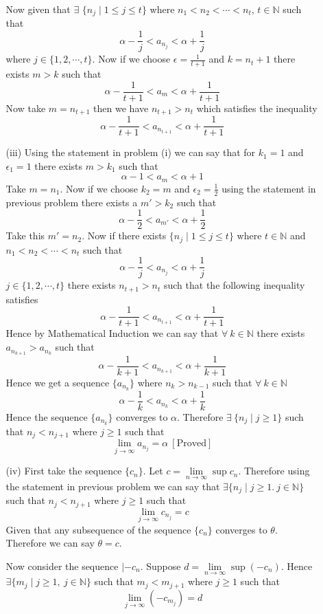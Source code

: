 \documentclass{article}
\begin{document}
\begin{enumerate}
\begin{enumerate}
	\hspace{1cm}Now given that $\exists$ $\{n_j\mid 1\leq j\leq t\}$ where $n_1<n_2<\cdots<n_t$, $t\in\mathbb{N}$ such that$$\alpha-\frac{1}{j}<a_{n_j}<\alpha+\frac1j$$where $j\in\{1,2,\cdots,t\}$. Now if we choose $\epsilon=\frac{1}{t+1}$ and $k=n_t+1$ there exists $m>k$ such that$$\alpha-\frac{1}{t+1}<a_{m}<\alpha+\frac1{t+1}$$Now take $m=n_{t+1}$ then we have $n_{t+1}>n_t$ which satisfies the inequality$$\alpha-\frac{1}{t+1}<a_{n_{t+1}}<\alpha+\frac1{t+1}$$
	\item[(iii)] Using the statement in problem (i) we can say that for $k_1=1$ and $\epsilon_1=1$ there exists $m>k_1$ such that $$\alpha-1<a_m<\alpha+1$$Take $m=n_1$. Now if we choose $k_2=m$ and $\epsilon_2=\frac12$ using the statement in previous problem there exists a $m'>k_2$ such that $$\alpha-\frac12<a_{m'}<\alpha+\frac12$$Take this $m'=n_2$. Now if there exists $\{n_j\mid 1\leq j\leq t\}$ where $t\in\mathbb{N}$ and $n_1<n_2<\cdots<n_t$ such that $$\alpha-\frac1j<a_{n_j}<\alpha+\frac1j$$$j\in\{1,2,\cdots,t\}$ there exists $n_{t+1}>n_t$ such that the following inequality satisfies$$\alpha-\frac1{t+1}<a_{n_{t+1}}<\alpha+\frac1{t+1}$$Hence by Mathematical Induction we can say that $\forall\ k\in\mathbb{N}$ there exists $a_{n_{k+1}}>a_{n_{k}}$ such that$$\alpha-\frac1{k+1}<a_{n_{k+1}}<\alpha+\frac1{k+1}$$Hence we get a sequence $\{a_{n_k}\}$ where $n_k>n_{k-1}$ such that $\forall \ k\in\mathbb{N}$ $$\alpha-\frac1k<a_{n_k}<\alpha+\frac1k$$Hence the sequence $\{a_{n_k}\}$ converges to $\alpha$. Therefore $\exists\ \{n_j\mid j\geq 1\} $ such that $n_j<n_{j+1}$ where $j\geq 1$ such that $$\lim\limits_{j\to\infty}a_{n_j}=\alpha\ [\text{Proved}]$$
	\item[(iv)] First take the sequence $\{c_n\}$. Let $c=\lim\limits_{n\to\infty}\sup c_n$. Therefore using the statement in previous problem we can say that $\exists \{n_j\mid j\geq 1.\ j\in\mathbb{N}\} $ such that $n_j<n_{j+1}$ where $j\geq 1$ such that $$\lim\limits_{j\to\infty}c_{n_j}=c$$Given that any subsequence of the sequence $\{c_n\}$ converges to $\theta$. Therefore we can say $\theta=c$.
	
	\hspace{1cm}Now consider the sequence $|{-c_n}$. Suppose $d=\lim\limits_{n\to\infty}\sup (-c_n)$. Hence $\exists \{m_j\mid j\geq 1,\ j\in\mathbb{N}\} $ such that $m_j<m_{j+1}$ where $j\geq 1$ such that $$\lim\limits_{j\to\infty}(-c_{m_j})=d$$
	

\end{enumerate}
\end{enumerate}
\end{document}
